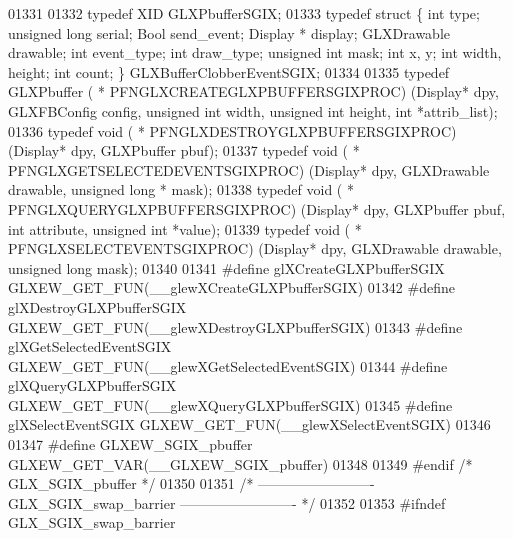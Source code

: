 \begin{DoxyCode}
01331 
01332 \textcolor{keyword}{typedef} XID GLXPbufferSGIX;
01333 \textcolor{keyword}{typedef} \textcolor{keyword}{struct }\{ \textcolor{keywordtype}{int} type; \textcolor{keywordtype}{unsigned} \textcolor{keywordtype}{long} serial; Bool send\_event; Display *
      display; GLXDrawable drawable; \textcolor{keywordtype}{int} event\_type; \textcolor{keywordtype}{int} draw\_type; \textcolor{keywordtype}{unsigned} \textcolor{keywordtype}{int} mask; \textcolor{keywordtype}{int} 
      x, y; \textcolor{keywordtype}{int} width, height; \textcolor{keywordtype}{int} count; \} GLXBufferClobberEventSGIX;
01334 
01335 \textcolor{keyword}{typedef} GLXPbuffer ( * PFNGLXCREATEGLXPBUFFERSGIXPROC) (Display* dpy, GLXFBConfig config, \textcolor{keywordtype}{unsigned} \textcolor{keywordtype}{int} 
      width, \textcolor{keywordtype}{unsigned} \textcolor{keywordtype}{int} height, \textcolor{keywordtype}{int} *attrib\_list);
01336 \textcolor{keyword}{typedef} void ( * PFNGLXDESTROYGLXPBUFFERSGIXPROC) (Display* dpy, GLXPbuffer pbuf);
01337 \textcolor{keyword}{typedef} void ( * PFNGLXGETSELECTEDEVENTSGIXPROC) (Display* dpy, GLXDrawable drawable, \textcolor{keywordtype}{unsigned} \textcolor{keywordtype}{long} *
      mask);
01338 \textcolor{keyword}{typedef} void ( * PFNGLXQUERYGLXPBUFFERSGIXPROC) (Display* dpy, GLXPbuffer pbuf, \textcolor{keywordtype}{int} attribute, \textcolor{keywordtype}{unsigned} \textcolor{keywordtype}{int}
       *value);
01339 \textcolor{keyword}{typedef} void ( * PFNGLXSELECTEVENTSGIXPROC) (Display* dpy, GLXDrawable drawable, \textcolor{keywordtype}{unsigned} \textcolor{keywordtype}{long} 
      mask);
01340 
01341 \textcolor{preprocessor}{#define glXCreateGLXPbufferSGIX GLXEW\_GET\_FUN(\_\_glewXCreateGLXPbufferSGIX)}
01342 \textcolor{preprocessor}{#define glXDestroyGLXPbufferSGIX GLXEW\_GET\_FUN(\_\_glewXDestroyGLXPbufferSGIX)}
01343 \textcolor{preprocessor}{#define glXGetSelectedEventSGIX GLXEW\_GET\_FUN(\_\_glewXGetSelectedEventSGIX)}
01344 \textcolor{preprocessor}{#define glXQueryGLXPbufferSGIX GLXEW\_GET\_FUN(\_\_glewXQueryGLXPbufferSGIX)}
01345 \textcolor{preprocessor}{#define glXSelectEventSGIX GLXEW\_GET\_FUN(\_\_glewXSelectEventSGIX)}
01346 
01347 \textcolor{preprocessor}{#define GLXEW\_SGIX\_pbuffer GLXEW\_GET\_VAR(\_\_GLXEW\_SGIX\_pbuffer)}
01348 
01349 \textcolor{preprocessor}{#endif }\textcolor{comment}{/* GLX\_SGIX\_pbuffer */}\textcolor{preprocessor}{}
01350 
01351 \textcolor{comment}{/* ------------------------- GLX\_SGIX\_swap\_barrier ------------------------- */}
01352 
01353 \textcolor{preprocessor}{#ifndef GLX\_SGIX\_swap\_barrier}

\end{DoxyCode}
